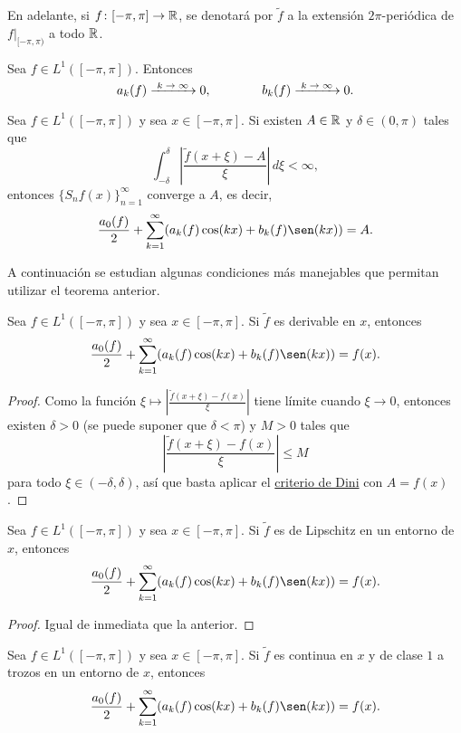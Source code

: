 \documentclass[a4paper, 12pt, extrafontsizes]{memoir}
\begin{document}
En adelante, si $f \colon [-\pi,\pi] \to \mathbb R$, se denotará por $\widetilde{f}$ a la extensión $2\pi$-periódica de $f |_{[-\pi,\pi)}$ a todo $\mathbb R$.

\begin{theorem}
    Sea $f \in L^1([-\pi,\pi])$. Entonces
    \[a_k(f) \kconv 0, \qquad \qquad b_k(f) \kconv 0.\]
\end{theorem}

\begin{theorem}\label{dini}
    Sea $f \in L^1([-\pi,\pi])$ y sea $x \in [-\pi,\pi]$. Si existen $A \in \mathbb R$ y $\delta \in (0,\pi)$ tales que
    \[\int_{-\delta}^\delta \left|\frac{\widetilde{f}(x+\xi)-A}{\xi}\right| \, d\xi < \infty,\]
    entonces $\{S_nf(x)\}_{n=1}^\infty$ converge a $A$, es decir, 
    \[\frac{a_0(f)}{2}+\sum_{k=1}^\infty (a_k(f)\cos(kx) + b_k(f)\sen(kx)) = A.\]
\end{theorem}

A continuación se estudian algunas condiciones más manejables que permitan utilizar el teorema anterior.

\begin{corollary}
    Sea $f \in L^1([-\pi,\pi])$ y sea $x \in [-\pi,\pi]$. Si $\widetilde{f}$ es derivable en $x$, entonces
    \[\frac{a_0(f)}{2}+\sum_{k=1}^\infty (a_k(f)\cos(kx) + b_k(f)\sen(kx)) = f(x).\]
\end{corollary}

\begin{proof}
    Como la función $\xi \mapsto \left|\frac{\widetilde{f}(x+\xi)-f(x)}{\xi}\right|$ tiene límite cuando $\xi \to 0$, entonces existen $\delta > 0$ (se puede suponer que $\delta < \pi$) y $M>0$ tales que
    \[\left|\frac{\widetilde{f}(x+\xi)-f(x)}{\xi}\right| \leq M\]
    para todo $\xi \in (-\delta,\delta)$, así que basta aplicar el \hyperref[dini]{\color{gray}criterio de Dini} con $A = f(x)$.
\end{proof}

\begin{corollary}
    Sea $f \in L^1([-\pi,\pi])$ y sea $x \in [-\pi,\pi]$. Si $\widetilde{f}$ es de Lipschitz en un entorno de $x$, entonces
    \[\frac{a_0(f)}{2}+\sum_{k=1}^\infty (a_k(f)\cos(kx) + b_k(f)\sen(kx)) = f(x).\]
\end{corollary}

\begin{proof}
    Igual de inmediata que la anterior.
\end{proof}

\begin{corollary}
    Sea $f \in L^1([-\pi,\pi])$ y sea $x \in [-\pi,\pi]$. Si $\widetilde{f}$ es continua en $x$ y de clase $1$ a trozos en un entorno de $x$, entonces
    \[\frac{a_0(f)}{2}+\sum_{k=1}^\infty (a_k(f)\cos(kx) + b_k(f)\sen(kx)) = f(x).\]
\end{corollary}
\end{document}
